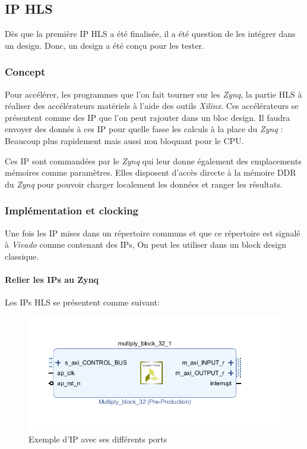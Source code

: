 \documentclass[12pt,a4paper]{article}
\begin{document}
\subsection{IP HLS}
Dès que la première IP HLS a été finalisée, il a été question de les intégrer dans un design. Donc, un design a été conçu pour les tester.
\subsubsection{Concept}
Pour accélérer, les programmes que l'on fait tourner sur les \textit{Zynq}, la partie HLS à réaliser des accélérateurs matériels à l'aide des outils \textit{Xilinx}. Ces accélérateurs se présentent comme des IP que l'on peut rajouter dans un bloc design. Il faudra envoyer des donnés à ces IP pour quelle fasse les calculs à la place du \textit{Zynq} : Beaucoup plus rapidement mais aussi non bloquant pour le CPU.

Ces IP sont commandées par le \textit{Zynq} qui leur donne également des emplacements mémoires comme paramètres. Elles disposent d'accès directe à la mémoire DDR du \textit{Zynq} pour pouvoir charger localement les données et ranger les résultats.

\subsubsection{Implémentation et clocking}
Une fois les IP mises dans un répertoire communs et que ce répertoire est signalé à \textit{ Vivado} comme contenant des IPs, On peut les utiliser dans un block design classique.
\paragraph{Relier les IPs au Zynq}
Les IPs HLS se présentent comme suivant:
\begin{figure}[H]
	\centering
	\includegraphics[width=\linewidth,trim=0 50 0 50,clip]{im/ip1.png}	
	\caption{Exemple d'IP avec ses différents ports}
	\label{fig-ip1}
\end{figure}
\end{document}
